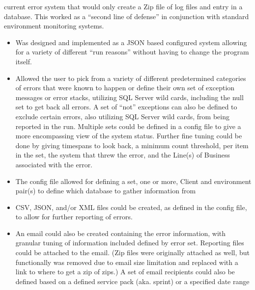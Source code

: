 \documentclass[margin]{res}
\begin{document}
\begin{resume}
\begin{itemize}
\begin{itemize}
               current error system that would only create a Zip file of log files and 
               entry in a database. This worked as a ``second line of defense'' in 
               conjunction with standard environment monitoring systems.
               \begin{itemize}
                  \item Was designed and implemented as a JSON based configured system 
                     allowing for a variety of different ``run reasons'' without having 
                     to change the program itself.
                  \item Allowed the user to pick from a variety of different predetermined 
                     categories of errors that were known to happen or define their own set 
                     of exception messages or error stacks, utilizing SQL Server wild cards, 
                     including the null set to get back all errors. A set of ``not'' exceptions 
                     can also be defined to exclude certain errors, also utilizing SQL Server 
                     wild cards, from being reported in the run. 
                     Multiple sets could be defined in a config file to give a more 
                     encompassing view of the system status. 
                     Further fine tuning could be done by giving timespans to look back, a 
                     minimum count threshold, per item in the set, the system that threw 
                     the error, and the Line(s) of Business associated with the error.
                  \item The config file allowed for defining a set, one or more, Client and 
                     environment pair(s) to define which database to gather information from
                  \item CSV, JSON, and/or XML files could be created, as defined in the  
                     config file, to allow for further reporting of errors.
                  \item An email could also be created containing the error information, with 
                     granular tuning of information included defined by error set. Reporting 
                     files could be attached to the email. (Zip files were originally attached 
                     as well, but functionally was removed due to email size limitation and 
                     replaced with a link to where to get a zip of zips.) A set of email 
                     recipients could also be 
                     defined based on a defined service pack (aka. sprint) or a specified date range 

\end{itemize}
\end{itemize}
\end{itemize}
\end{resume}
\end{document}

